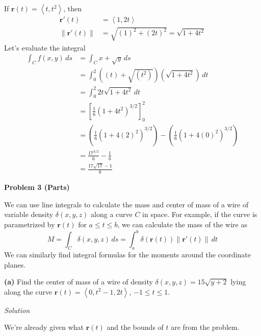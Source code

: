 \documentclass{article}
\newcommand{\lrp}[1]{\left( #1 \right)}
\newcommand{\lra}[1]{\left\langle #1 \right\rangle}
\newcommand{\lrb}[1]{\left[ #1 \right]}
\newcommand{\norm}[1]{\left\lVert #1 \right\rVert}
\renewcommand{\r}[0]{\mathbf{r}}
\newcommand{\Solution}{\textit{Solution}}
\begin{document}
If $\r(t)=\lra{t,t^2}$, then
\begin{align*}
    \r'(t)&=\lra{1,2t}\\
    \norm{\r'(t)}&=\sqrt{(1)^2+(2t)^2}=\sqrt{1+4t^2}
\end{align*}
Let's evaluate the integral
\begin{align*}
    \int_C f(x,y)\,ds&=\int_C x+\sqrt{y}\,ds\\
    &=\int_0^2 \lrp{(t)+\sqrt{(t^2)}}\lrp{\sqrt{1+4t^2}}\,dt\\
    &=\int_0^2 {2t}\sqrt{1+4t^2}\,dt\\
    &=\lrb{\frac{1}{6}(1+4t^2)^{3/2}}_0^2\tag{or do u-sub with $u=1+4t^2$}\\
    &=\lrp{\frac{1}{6}\lrp{1+4(2)^2}^{3/2}}-\lrp{\frac{1}{6}\lrp{1+4(0)^2}^{3/2}}\\
    &=\frac{17^{3/2}}{6}-\frac{1}{6}\\
    &=\boxed{\frac{17\sqrt{17}-1}{6}}
\end{align*}
\newpage
{}
{}\textbf{Problem 3 (Parts)}

We can use line integrals to calculate the mass and center of mass of a wire of
variable density $\delta (x,y,z)$ along a curve $C$ in space. For example, if the curve is
parametrized by $\r(t)$ for $a\leq t\leq b$, we can calculate the mass of the wire as
\begin{equation*}
    M=\int_C \delta(x,y,z)\,ds=\int_a^b \delta(\r(t))\lVert \r'(t)\rVert\,dt
\end{equation*}
We can similarly find integral formulas for the moments around the coordinate planes.

{}\textbf{(a)} Find the center of mass of a wire of density $\delta (x,y,z)=15\sqrt{y+2}$ lying along the
curve $\r(t)=\lra{0,t^2-1,2t}$, $-1\leq t\leq 1$.

\Solution

We're already given what $\r(t)$ and the bounds of $t$ are from the problem.
\end{document}
